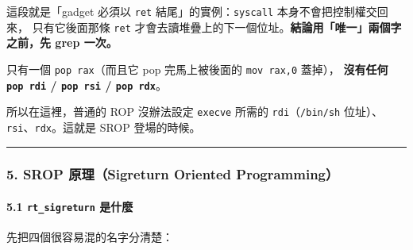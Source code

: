 \documentclass[10pt,a4paper]{article}
\renewenvironment{quote}{%
  \begin{mdframed}[linewidth=0pt,innerleftmargin=0pt,innerrightmargin=0pt,
    innerbottommargin=0pt,innertopmargin=0pt,skipabove=0.55em,skipbelow=0.55em,
    leftmargin=0.9em,rightmargin=0.4em,startcode={\color{quotebar}\vrule width 2.6pt},%
    endcode={}]%
  \itshape\color{black}%
}{%
  \end{mdframed}%
}
\begin{document}
\begin{quote}
這段就是「gadget 必須以 \texttt{ret} 結尾」的實例：\texttt{syscall}
本身不會把控制權交回來， 只有它後面那條 \texttt{ret}
才會去讀堆疊上的下一個位址。\textbf{結論用「唯一」兩個字之前，先 grep
一次。}
\end{quote}

只有一個 \texttt{pop\ \allowbreak{}rax}（而且它 pop 完馬上被後面的
\texttt{mov\ \allowbreak{}rax,\allowbreak{}0} 蓋掉）， \textbf{沒有任何 \texttt{pop\ \allowbreak{}rdi} /
\texttt{pop\ \allowbreak{}rsi} / \texttt{pop\ \allowbreak{}rdx}}。

所以在這裡，普通的 ROP 沒辦法設定 \texttt{execve} 所需的
\texttt{rdi}（\texttt{/\allowbreak{}bin/\allowbreak{}sh} 位址）、
\texttt{rsi}、\texttt{rdx}。這就是 SROP 登場的時候。

\begin{center}\rule{0.5\linewidth}{0.5pt}\end{center}

\subsubsection{5. SROP 原理（Sigreturn Oriented
Programming）}\label{srop-ux539fux7406sigreturn-oriented-programming}

\paragraph{\texorpdfstring{5.1 \texttt{rt\_\allowbreak{}sigreturn}
是什麼}{5.1 rt\_sigreturn 是什麼}}\label{rt_sigreturn-ux662fux4ec0ux9ebc}

先把四個很容易混的名字分清楚：
\end{document}
